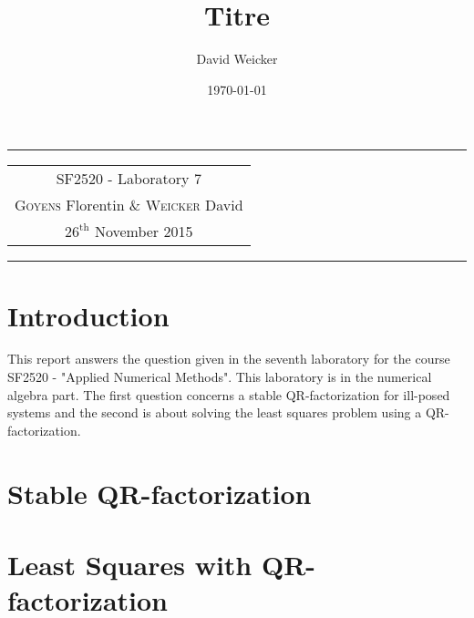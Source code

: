 \documentclass[11pt,a4paper]{article}
\title{Titre}
\author{David Weicker}
\date{\today}
\begin{document}
\tabulinesep=1.2mm
\begin{center}
\hrule
\begin{tabular}{c}
\\[0.005cm]
\Large{SF2520 - Laboratory 7}\\[0.3cm] %
\textsc{Goyens} Florentin  \& \textsc{Weicker} David \\[0.2cm]
$\text{26}^{\text{th}}$ November 2015\\[0.2cm] %
\end{tabular}
\hrule
\end{center}

\section*{Introduction}

This report answers the question given in the seventh laboratory for the course SF2520 - "Applied Numerical Methods". This laboratory is in the numerical algebra part. The first question concerns a stable QR-factorization for ill-posed systems and the second is about solving the least squares problem using a QR-factorization.

\section{Stable QR-factorization}


 
\section{Least Squares with QR-factorization}


\end{document}
